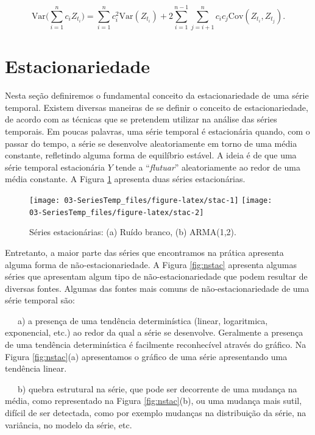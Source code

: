 \documentclass[
]{book}
\theoremstyle{definition}
\theoremstyle{definition}
\theoremstyle{definition}
\theoremstyle{remark}
\begin{document}
\begin{equation}
\mbox{Var}\bigg(\sum_{i=1}^{n}c_i Z_{t_i}\bigg)=\sum_{i=1}^{n}c_i^2\mbox{Var}(Z_{t_i})
+ 2\sum_{i=1}^{n-1}\sum_{j={i+1}}^{n}c_ic_j\mbox{Cov}(Z_{t_i}, Z_{t_j}).
\label{eq:covsum2}
\end{equation}

\hypertarget{estacionariedade}{%
\section{Estacionariedade}\label{estacionariedade}}

Nesta seção definiremos o fundamental conceito da estacionariedade de uma série temporal. Existem diversas maneiras de se definir o conceito de estacionariedade, de acordo com as técnicas que se pretendem utilizar na análise das séries temporais. Em poucas palavras, uma série temporal é estacionária quando, com o passar do tempo, a série se desenvolve aleatoriamente em torno de uma média constante, refletindo alguma forma de equilíbrio estável. A ideia é de que uma série temporal estacionária \(Y\) tende a ``\emph{flutuar}'' aleatoriamente ao redor de uma média constante. A Figura \ref{fig:stac} apresenta duas séries estacionárias.

\begin{figure}
\texttt{[image: 03-SeriesTemp\_files/figure-latex/stac-1]} \texttt{[image: 03-SeriesTemp\_files/figure-latex/stac-2]} \caption{ Séries estacionárias: (a) Ruído branco, (b) ARMA(1,2).}\label{fig:stac}
\end{figure}

Entretanto, a maior parte das séries que encontramos na prática apresenta alguma forma de não-estacionariedade. A Figura \ref{fig:nstac} apresenta algumas séries que apresentam algum tipo de não-estacionariedade que podem resultar de diversas fontes. Algumas das fontes mais comuns de não-estacionariedade de uma série temporal são:

~~~a) a presença de uma tendência determinística (linear, logaritmica, exponencial, etc.) ao redor da qual a série se desenvolve. Geralmente a presença de uma tendência determinística é facilmente reconhecível através do gráfico. Na Figura \ref{fig:nstac}(a) apresentamos o gráfico de uma série apresentando uma tendência linear.

~~~b) quebra estrutural na série, que pode ser decorrente de uma mudança na média, como representado na Figura \ref{fig:nstac}(b), ou uma mudança mais sutil, difícil de ser detectada, como por exemplo mudanças na distribuição da série, na variância, no modelo da série, etc.
\end{document}
